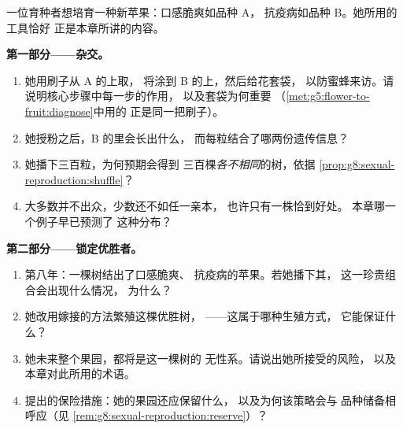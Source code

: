 \begin{problem}\label{pb:g8:sexual-reproduction:1}
一位育种者想培育一种新苹果：口感脆爽如品种 A，
抗疫病如品种 B。她所用的工具恰好
正是本章所讲的内容。

\medskip\noindent\textbf{第一部分——杂交。}
\begin{enumerate}
  \item 她用刷子从 A 的上取，
        将涂到 B 的上，然后给花套袋，
        以防蜜蜂来访。请说明核心步骤中每一步的作用，
        以及套袋为何重要
        （\cref{met:g5:flower-to-fruit:diagnose}中用的
        正是同一把刷子）。
  \item 她授粉之后，B 的里会长出什么，
        而每粒结合了哪两份遗传信息？
  \item 她播下三百粒，为何预期会得到
        三百棵\emph{各不相同}的树，依据
        \cref{prop:g8:sexual-reproduction:shuffle}？
  \item 大多数并不出众，少数还不如任一亲本，
        也许只有一株恰到好处。
        本章哪一个例子早已预测了
        这种分布？
\end{enumerate}

\medskip\noindent\textbf{第二部分——锁定优胜者。}
\begin{enumerate}[resume]
  \item 第八年：一棵树结出了口感脆爽、
        抗疫病的苹果。若她播下其，
        这一珍贵组合会出现什么情况，
        为什么？
  \item 她改用嫁接的方法繁殖这棵优胜树，
——这属于哪种生殖方式，
        它能保证什么？
  \item 她未来整个果园，都将是这一棵树的
        无性系。请说出她所接受的风险，
        以及本章对此所用的术语。
  \item 提出的保险措施：她的果园还应保留什么，
        以及为何该策略会与
        品种储备相呼应（见
        \cref{rem:g8:sexual-reproduction:reserve}）？
\end{enumerate}


\end{problem}
